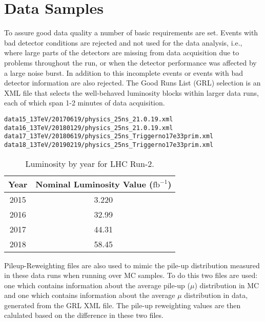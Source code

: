 \chapter{Data Samples}

To assure good data quality a number of basic requirements are set.  Events with bad detector conditions are rejected and not used for the data analysis, i.e., where large parts of the detectors are missing from data acquisition due to problems throughout the run, or when the detector performance was affected by a large noise burst.  In addition to this incomplete events or events with bad detector information are also rejected.  
The Good Runs List (GRL) selection is an XML file that selects the well-behaved luminosity blocks within larger data runs, each of which span 1-2 minutes of data acquisition.
\begin{verbatim}
data15_13TeV/20170619/physics_25ns_21.0.19.xml 
data16_13TeV/20180129/physics_25ns_21.0.19.xml 
data17_13TeV/20180619/physics_25ns_Triggerno17e33prim.xml
data18_13TeV/20190219/physics_25ns_Triggerno17e33prim.xml
\end{verbatim}
\begin{table}[h]
\begin{center}
{\renewcommand{\arraystretch}{1.2}
\begin{tabular}{c|c}
\hline
 Year & Nominal Luminosity Value ($\text{fb}^{-1}$) \\ \hline 2015 & 3.220  \\
2016 & 32.99 \\
2017 & 44.31 \\
2018 & 58.45 \\ \hline
\end{tabular}
\caption{Luminosity by year for LHC Run-2. }
}
\end{center}
\end{table}

Pileup-Reweighting files are also used to mimic the pile-up distribution measured in these data runs when running over MC samples.  To do this two files are used: one which contains information about the average pile-up ($\mu$) distribution in MC and one which contains information about the average $\mu$ distribution in data, generated from the GRL XML file.  The pile-up reweighting values are then calulated based on the difference in these two files.
